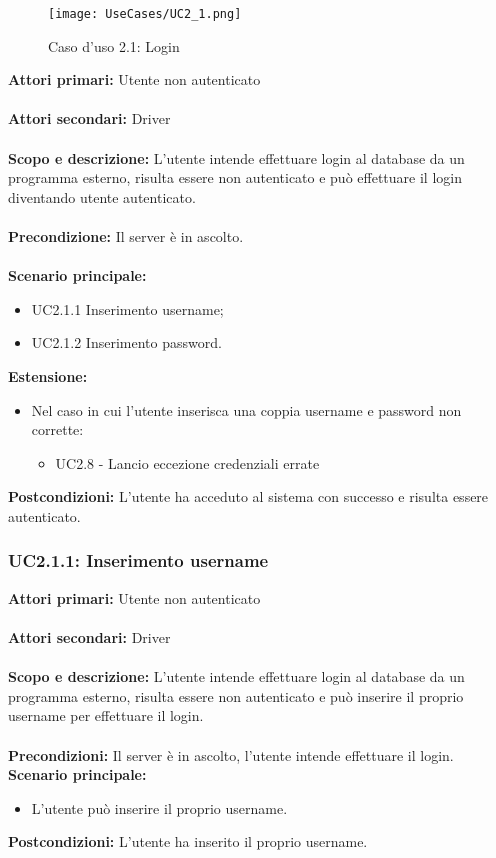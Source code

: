 \documentclass{scalatekids-article}
\begin{document}
\begin{figure}[H]
  \begin{center}
    \texttt{[image: UseCases/UC2\_1.png]}
    \caption*{Caso d'uso 2.1: Login}
  \end{center}
\end{figure}
\textbf{Attori primari:} Utente non autenticato\\ \\
\textbf{Attori secondari:} Driver\\ \\
\textbf{Scopo e descrizione:}
L'utente intende effettuare login al database da un programma  esterno, risulta essere non autenticato e può effettuare il login diventando utente autenticato.\\ \\
\textbf{Precondizione:} Il server è in ascolto.\\ \\
\textbf{Scenario principale:}
\begin{itemize}
\item UC2.1.1 Inserimento username;
\item UC2.1.2 Inserimento password.
\end{itemize}
\textbf{Estensione:}
\begin{itemize}
  \item Nel caso in cui l'utente inserisca una coppia username e password non corrette:
  \begin{itemize}
    \item UC2.8 - Lancio eccezione credenziali errate
  \end{itemize}
\end{itemize}
\textbf{Postcondizioni:} L'utente ha acceduto al sistema con successo e risulta essere autenticato.

\subsubsection{UC2.1.1: Inserimento username}

\textbf{Attori primari:} Utente non autenticato\\ \\
\textbf{Attori secondari:} Driver\\ \\
\textbf{Scopo e descrizione:}
L'utente intende effettuare login al database da un programma  esterno, risulta essere non autenticato e può inserire il proprio username per effettuare il login.\\ \\
\textbf{Precondizioni:} Il server è in ascolto, l'utente intende effettuare il login.
\textbf{Scenario principale:}
\begin{itemize}
\item L'utente può inserire il proprio username.
\end{itemize}
\textbf{Postcondizioni:} L'utente ha inserito il proprio username.
\end{document}
